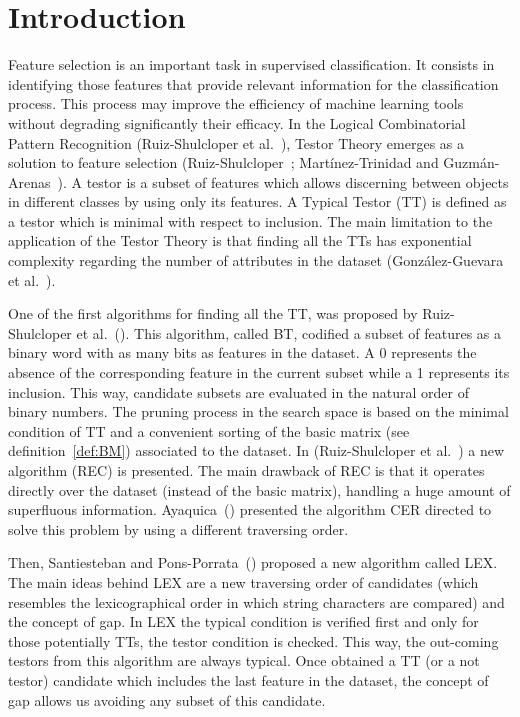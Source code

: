 \documentclass[citeauthoryear]{llncs}
\begin{document}
\section{Introduction}
%
	Feature selection is an important task in supervised classification. It consists in identifying those features that provide relevant information for the classification process. This process may improve the efficiency of machine learning tools without degrading significantly their efficacy.
	In the Logical Combinatorial Pattern Recognition (Ruiz-Shulcloper et al.~\cite{Shulcloper1995}), Testor Theory emerges as a solution to feature selection (Ruiz-Shulcloper~\cite{Shulcloper2008};	Mart\'inez-Trinidad and	Guzm\'an-Arenas~\cite{Martinez2001}). A testor is a subset of features which allows discerning between objects in different classes by using only its features. A Typical Testor (TT) is defined as a testor which is minimal with respect to inclusion. The main limitation to the application of the Testor Theory is that finding all the TTs has exponential complexity regarding the number of attributes in the dataset (González-Guevara et al.~\cite{Gonzalez15}).
	
	One of the first algorithms for finding all the TT, was proposed by Ruiz-Shulcloper et al.~(\cite{Shulcloper1985}). This algorithm, called BT, codified a subset of features as a binary word with as many bits as features in the dataset. A 0 represents the absence of the corresponding feature in the current	subset while a 1 represents its inclusion. This way, candidate subsets are evaluated in the natural order of binary numbers. The pruning process in the	search space is based on the minimal condition of TT and a convenient sorting of the basic matrix (see definition~\ref{def:BM}) associated to the dataset. In (Ruiz-Shulcloper et al.~\cite{Shulcloper1995b}) a new algorithm (REC) is presented.	The main drawback of REC is that it operates directly over the dataset (instead of the	basic matrix), handling a huge amount of superfluous information. Ayaquica~(\cite{Ayaquica1997})	presented the algorithm CER directed to solve this problem by using a different traversing	order. 
	
	Then, Santiesteban and Pons-Porrata~(\cite{Santiesteban2003}) proposed a new algorithm called LEX. The main ideas behind LEX are a new traversing order of candidates (which resembles the	lexicographical order in which string characters are compared) and the concept of gap. In LEX the typical condition is verified first and only for those potentially TTs, the testor condition is checked. This way, the out-coming testors from this algorithm are always typical. Once obtained a TT (or a not testor) candidate which includes the last feature in the dataset, the concept of gap allows us avoiding any subset of this candidate.
	
\end{document}
